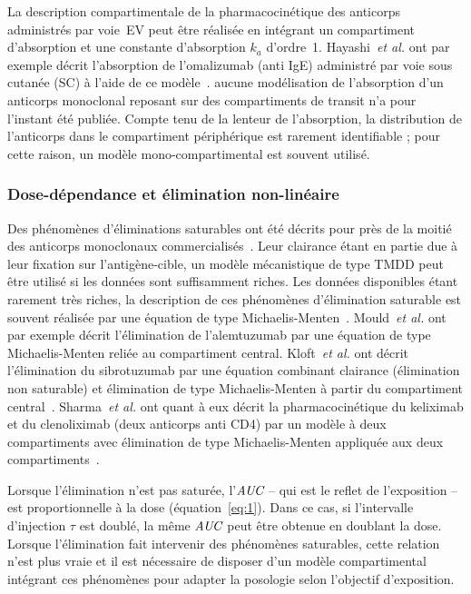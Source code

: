 La description compartimentale de la pharmacocinétique des anticorps administrés par voie~EV peut être réalisée en intégrant un compartiment d'absorption et une constante d'absorption $k_{a}$ d'ordre~1. Hayashi~\textit{et al.} ont par exemple décrit l'absorption de l'omalizumab (anti IgE) administré par voie sous cutanée (SC) à l'aide de ce modèle~\citep{REF61}. aucune modélisation de l'absorption d'un anticorps monoclonal reposant sur des compartiments de transit n'a pour l'instant été publiée. Compte tenu de la lenteur de l'absorption, la distribution de l'anticorps dans le compartiment périphérique est rarement identifiable ; pour cette raison, un modèle mono-compartimental est souvent utilisé.

\subsubsection{Dose-dépendance et élimination non-linéaire}
Des phénomènes d'éliminations saturables ont été décrits pour près de la moitié des anticorps monoclonaux commercialisés~\citep{REF62}. Leur clairance étant en partie due à leur fixation sur l'antigène-cible, un modèle mécanistique de type TMDD peut être utilisé si les données sont suffisamment riches. Les données disponibles étant rarement très riches, la description de ces phénomènes d'élimination saturable est souvent réalisée par une équation de type Michaelis-Menten~\citep{REF3}. Mould~\textit{et al.} ont par exemple décrit l'élimination de l'alemtuzumab par une équation de type Michaelis-Menten reliée au compartiment central. Kloft~\textit{et al.} ont décrit l'élimination du sibrotuzumab par une équation combinant clairance (élimination non saturable) et élimination de type Michaelis-Menten à partir du compartiment central~\citep{REF63}. Sharma~\textit{et al.} ont quant à eux décrit la pharmacocinétique du keliximab et du clenoliximab (deux anticorps anti CD4)  par un modèle à deux compartiments avec élimination de type Michaelis-Menten appliquée aux deux compartiments~\citep{REF64}.

Lorsque l'élimination n'est pas saturée, l'$\operatorname{\textit{AUC}}$ -- qui est le reflet de l'exposition -- est proportionnelle à la dose (équation~\ref{eq:1}). Dans ce cas, si l'intervalle d'injection $\tau$ est doublé, la même $\operatorname{\textit{AUC}}$ peut être obtenue en doublant la dose. Lorsque l'élimination fait intervenir des phénomènes saturables, cette relation n'est plus vraie et il est nécessaire de disposer d'un modèle compartimental intégrant ces phénomènes pour adapter la posologie selon l'objectif d'exposition.

